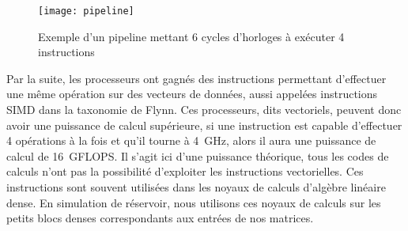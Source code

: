 \begin{figure}[!h]
  \centering
  \texttt{[image: pipeline]}
  \caption{Exemple d'un pipeline mettant 6 cycles d'horloges à exécuter 4 instructions}
  \label{fig:pipeline}
\end{figure}



Par la suite, les processeurs ont gagnés des instructions permettant d'effectuer une même opération sur des vecteurs de données, aussi appelées instructions SIMD dans la taxonomie de Flynn.
%
Ces processeurs, dits vectoriels, peuvent donc avoir une puissance de calcul supérieure, si une instruction est capable d'effectuer 4 opérations à la fois et qu'il tourne à 4~GHz, alors il aura une puissance de calcul de 16~GFLOPS.
%
Il s'agit ici d'une puissance théorique, tous les codes de calculs n'ont pas la possibilité d'exploiter les instructions vectorielles.
%
Ces instructions sont souvent utilisées dans les noyaux de calculs d'algèbre linéaire dense.
%
En simulation de réservoir, nous utilisons ces noyaux de calculs sur les petits blocs denses correspondants aux entrées de nos matrices.
